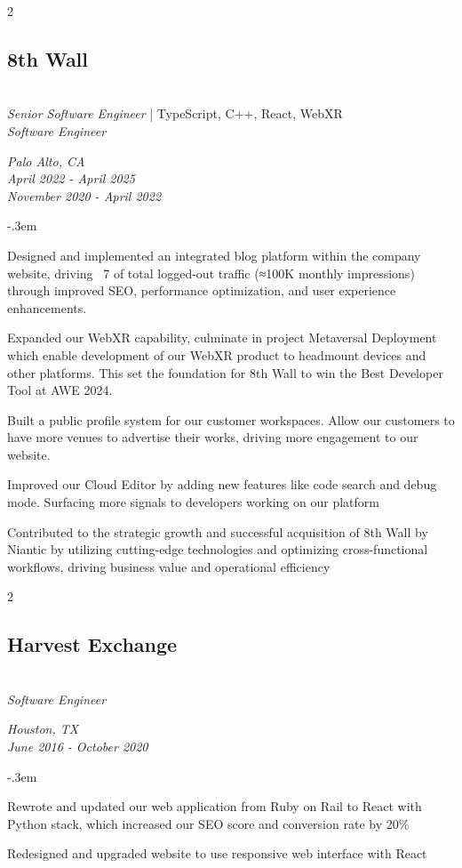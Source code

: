 \documentclass{article}
\let\olditemize=\itemize \let\endolditemize=\enditemize
\renewenvironment{itemize}{\olditemize[topsep=0em] \itemsep-.3em}{\endolditemize}
\newenvironment{twocolentry}[2][]{
    \def\secondColumn{#2}
    \raggedright
    \setcolumnwidth{\fill, 6cm}
    \begin{paracol}{2}
}{
    \switchcolumn \raggedleft \secondColumn
    \end{paracol}
} %
\begin{document}
\begin{twocolentry}{
  \textit{Palo Alto, CA} \\
  \textit{April 2022 - April 2025} \\
  \textit{November 2020 - April 2022}
}
\subsection{8th Wall}\hfill\\
\textit{Senior Software Engineer} | TypeScript, C++, React, WebXR \\
\textit{Software Engineer}
\end{twocolentry}
\begin{itemize}
  \item Designed and implemented an integrated blog platform within the company website, driving ~7%
  of total logged-out traffic (≈100K monthly impressions) through improved SEO, performance
  optimization, and user experience enhancements.
  \item Expanded our WebXR capability, culminate in project Metaversal Deployment which enable
  development of our WebXR product to headmount devices and other platforms. This set the foundation
  for 8th Wall to win the Best Developer Tool at AWE 2024.
  \item Built a public profile system for our customer workspaces. Allow our customers to have more
  venues to advertise their works, driving more engagement to our website. 
  \item Improved our Cloud Editor by adding new features like code search and debug mode. Surfacing
  more signals to developers working on our platform
  \item Contributed to the strategic growth and successful acquisition of 8th Wall by Niantic by
  utilizing cutting-edge technologies and optimizing cross-functional workflows, driving business
  value and operational efficiency
\end{itemize}

\begin{twocolentry}{
  \textit{Houston, TX} \\
  \textit{June 2016 - October 2020} \\
}
\subsection{Harvest Exchange}\hfill\\
\textit{Software Engineer}
\end{twocolentry}
\begin{itemize}
  \item Rewrote and updated our web application from Ruby on Rail to React with Python stack, which
  increased our SEO score and conversion rate by 20\%
  \item Redesigned and upgraded website to use responsive web interface with React
\end{itemize}
\end{document}
